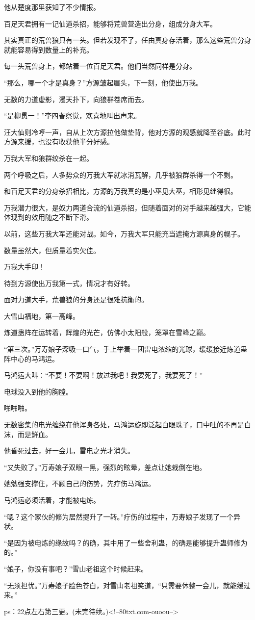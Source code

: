 \begin{this_body}
他从楚度那里获知了不少情报。

百足天君拥有一记仙道杀招，能够将荒兽营造出分身，组成分身大军。

其实真正的荒兽狼只有一头。但若发现不了，任由真身存活着，那么这些荒兽分身就能容易得到数量上的补充。

每一头荒兽身上，都站着一位百足天君。他们当然同样是分身。

“那么，哪一个才是真身？”方源皱起眉头，下一刻，他使出万我。

无数的力道虚影，漫天扑下，向狼群卷席而去。

“是柳贯一！”李四春察觉，欢喜地叫出声来。

汪大仙则冷哼一声，自从上次方源拉他做垫背，他对方源的观感就降至谷底。此时方源来援，也没有收获他半分好感。

万我大军和狼群绞杀在一起。

两个呼吸之后，人多势众的万我大军就冰消瓦解，几乎被狼群杀得一个不剩。

和百足天君的分身杀招相比，方源的万我真的是小巫见大巫，相形见绌得很。

万我潜力很大，是奴力两道合流的仙道杀招，但随着面对的对手越来越强大，它能体现到的效用随之不断下滑。

以前，这些万我大军还能对战。如今，万我大军只能充当遮掩方源真身的幌子。

数量虽然大，但质量着实欠佳。

万我大手印！

待到方源使出万我第一式，情况才有好转。

面对力道大手，荒兽狼的分身还是很难抗衡的。

大雪山福地，第一高峰。

炼道蛊阵在运转着，辉煌的光芒，仿佛小太阳般，笼罩在雪峰之巅。

“第三次。”万寿娘子深吸一口气，手上举着一团雷电浓缩的光球，缓缓接近炼道蛊阵中心的马鸿运。

马鸿运大叫：“不要！不要啊！放过我吧！我要死了，我要死了！”

电球没入到他的胸膛。

啪啪啪。

无数密集的电光缠绕在他浑身各处，马鸿运旋即泛起白眼珠子，口中吐的不再是白沫，而是鲜血。

他昏死过去，好一会儿，雷电之光才消失。

“又失败了。”万寿娘子双眼一黑，强烈的眩晕，差点让她栽倒在地。

她勉强支撑住，不顾自己的伤势，先疗伤马鸿运。

马鸿运必须活着，才能被电炼。

“嗯？这个家伙的修为居然提升了一转。”疗伤的过程中，万寿娘子发现了一个异状。

“是因为被电炼的缘故吗？的确，其中用了一些舍利蛊，的确是能够提升蛊师修为的。”

“娘子，你没有事吧？”雪山老祖这个时候赶来。

“无须担忧。”万寿娘子脸色苍白，对雪山老祖笑道，“只需要休整一会儿，就能缓过来。”

ps：22点左右第三更。(未完待续。)<!--80txt.com-ouoou-->

\end{this_body}

